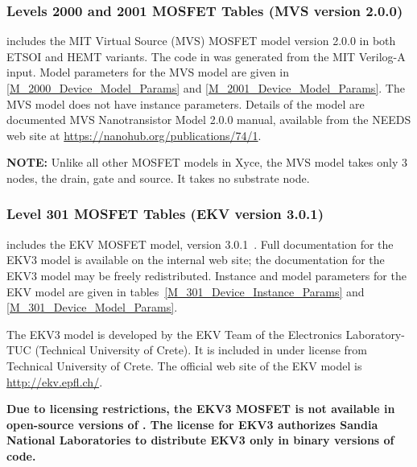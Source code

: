 



\clearpage
\subsubsection{Levels 2000 and 2001 MOSFET Tables (MVS version 2.0.0)}
\Xyce{} includes the MIT Virtual Source (MVS) MOSFET model version
2.0.0 in both ETSOI and HEMT variants.  The code in \Xyce{} was
generated from the MIT Verilog-A input.  Model parameters for the MVS
model are given in \ref{M_2000_Device_Model_Params} and
\ref{M_2001_Device_Model_Params}.  The MVS model does not have
instance parameters.  Details of the model are documented MVS
Nanotransistor Model 2.0.0 manual, available from the NEEDS web site
at \url{https://nanohub.org/publications/74/1}.

{\bf NOTE: } Unlike all other MOSFET models in Xyce, the MVS model
takes only 3 nodes, the drain, gate and source.  It takes no substrate
node.




\clearpage
\subsubsection{Level 301 MOSFET Tables (EKV version 3.0.1)}
\Xyce{} includes the EKV MOSFET model, version
3.0.1~\cite{BLETK:1997}\cite{EKV:2006}\cite{EKV:2007}.  Full
documentation for the EKV3 model is available on the \Xyce{} internal web site;
the documentation for the EKV3 model may be freely redistributed.  Instance and
model parameters for the EKV model are given in
tables~\ref{M_301_Device_Instance_Params} and \ref{M_301_Device_Model_Params}.

The EKV3 model is developed by the EKV Team of the Electronics Laboratory-TUC
(Technical University of Crete). It is included in \Xyce{} under license from
Technical University of Crete.  The official web site of the EKV model is
\url{http://ekv.epfl.ch/}.

\textbf{Due to licensing restrictions, the EKV3 MOSFET is not available in
     open-source versions of \Xyce{}.  The license for EKV3 authorizes Sandia
     National Laboratories to distribute EKV3 only in binary versions of code.}




